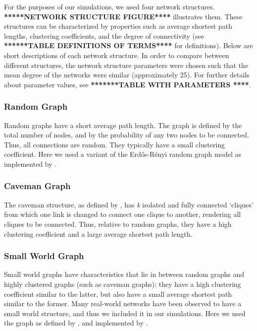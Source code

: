 For the purposes of our simulations, we used four network structures. \textbf{*****NETWORK STRUCTURE FIGURE****} illustrates them. These structures can be characterized by properties such as average shortest path lengths, clustering coefficients, and the degree of connectivity (see \textbf{******TABLE DEFINITIONS OF TERMS****} for definitions). Below are short descriptions of each network structure. In order to compare between different structures, the network structure parameters were chosen such that the mean degree of the networks were similar (approximately 25). For further details about parameter values, see \textbf{*******TABLE WITH PARAMETERS ****}.

\subsubsection{Random Graph}

Random graphs have a short average path length. The graph is defined by the total number of nodes, and by the probability of any two nodes to be connected. Thus, all connections are random. They typically have a small clustering coefficient. Here we used a variant of the Erd\H{o}s-R\'enyi random graph model \citep*{ER1960} as implemented by \citet*{BS2011}.

\subsubsection{Caveman Graph}

The caveman structure, as defined by \citet*{W2003}, has \emph{k} isolated and fully connected `cliques' from which one link is changed to connect one clique to another, rendering all cliques to be connected. Thus, relative to random graphs, they have a high clustering coefficient and a large average shortest path length.

\subsubsection{Small World Graph}

Small world graphs have characteristics that lie in between random graphs and highly clustered graphs (such as caveman graphs): they have a high clustering coefficient similar to the latter, but also have a small average shortest path similar to the former. Many real-world networks have been observed to have a small world structure, and thus we included it in our simulations. Here we used the graph as defined by \citet*{WS1998}, and implemented by \citet*{BS2011}.

